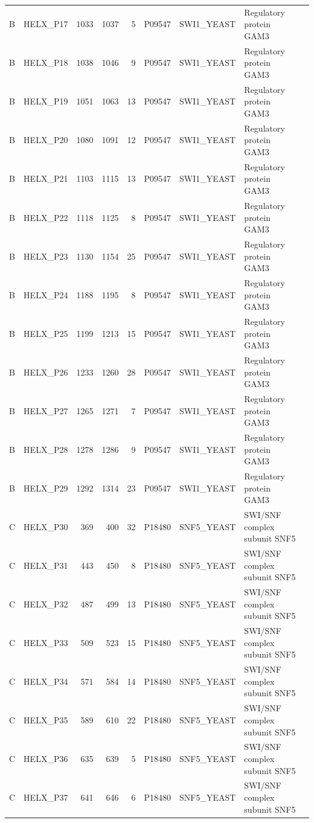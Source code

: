 \begin{longtable}{@{}llrrrrllp{5.2cm}@{}}
  B & HELX_P17 & 1033 & 1037 & 5 & P09547 & SWI1_YEAST & Regulatory protein GAM3 \\
  B & HELX_P18 & 1038 & 1046 & 9 & P09547 & SWI1_YEAST & Regulatory protein GAM3 \\
  B & HELX_P19 & 1051 & 1063 & 13 & P09547 & SWI1_YEAST & Regulatory protein GAM3 \\
  B & HELX_P20 & 1080 & 1091 & 12 & P09547 & SWI1_YEAST & Regulatory protein GAM3 \\
  B & HELX_P21 & 1103 & 1115 & 13 & P09547 & SWI1_YEAST & Regulatory protein GAM3 \\
  B & HELX_P22 & 1118 & 1125 & 8 & P09547 & SWI1_YEAST & Regulatory protein GAM3 \\
  B & HELX_P23 & 1130 & 1154 & 25 & P09547 & SWI1_YEAST & Regulatory protein GAM3 \\
  B & HELX_P24 & 1188 & 1195 & 8 & P09547 & SWI1_YEAST & Regulatory protein GAM3 \\
  B & HELX_P25 & 1199 & 1213 & 15 & P09547 & SWI1_YEAST & Regulatory protein GAM3 \\
  B & HELX_P26 & 1233 & 1260 & 28 & P09547 & SWI1_YEAST & Regulatory protein GAM3 \\
  B & HELX_P27 & 1265 & 1271 & 7 & P09547 & SWI1_YEAST & Regulatory protein GAM3 \\
  B & HELX_P28 & 1278 & 1286 & 9 & P09547 & SWI1_YEAST & Regulatory protein GAM3 \\
  B & HELX_P29 & 1292 & 1314 & 23 & P09547 & SWI1_YEAST & Regulatory protein GAM3 \\
  C & HELX_P30 & 369 & 400 & 32 & P18480 & SNF5_YEAST & SWI/SNF complex subunit SNF5 \\
  C & HELX_P31 & 443 & 450 & 8 & P18480 & SNF5_YEAST & SWI/SNF complex subunit SNF5 \\
  C & HELX_P32 & 487 & 499 & 13 & P18480 & SNF5_YEAST & SWI/SNF complex subunit SNF5 \\
  C & HELX_P33 & 509 & 523 & 15 & P18480 & SNF5_YEAST & SWI/SNF complex subunit SNF5 \\
  C & HELX_P34 & 571 & 584 & 14 & P18480 & SNF5_YEAST & SWI/SNF complex subunit SNF5 \\
  C & HELX_P35 & 589 & 610 & 22 & P18480 & SNF5_YEAST & SWI/SNF complex subunit SNF5 \\
  C & HELX_P36 & 635 & 639 & 5 & P18480 & SNF5_YEAST & SWI/SNF complex subunit SNF5 \\
  C & HELX_P37 & 641 & 646 & 6 & P18480 & SNF5_YEAST & SWI/SNF complex subunit SNF5 \\

\end{longtable}
